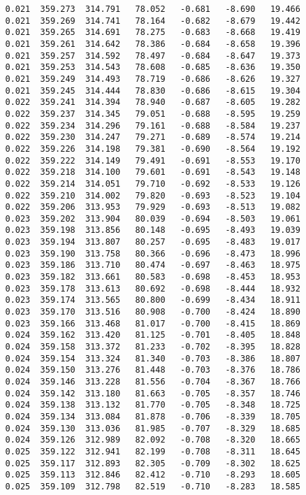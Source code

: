 \begin{verbatim}
   0.021  359.273  314.791   78.052   -0.681   -8.690   19.466
   0.021  359.269  314.741   78.164   -0.682   -8.679   19.442
   0.021  359.265  314.691   78.275   -0.683   -8.668   19.419
   0.021  359.261  314.642   78.386   -0.684   -8.658   19.396
   0.021  359.257  314.592   78.497   -0.684   -8.647   19.373
   0.021  359.253  314.543   78.608   -0.685   -8.636   19.350
   0.021  359.249  314.493   78.719   -0.686   -8.626   19.327
   0.021  359.245  314.444   78.830   -0.686   -8.615   19.304
   0.022  359.241  314.394   78.940   -0.687   -8.605   19.282
   0.022  359.237  314.345   79.051   -0.688   -8.595   19.259
   0.022  359.234  314.296   79.161   -0.688   -8.584   19.237
   0.022  359.230  314.247   79.271   -0.689   -8.574   19.214
   0.022  359.226  314.198   79.381   -0.690   -8.564   19.192
   0.022  359.222  314.149   79.491   -0.691   -8.553   19.170
   0.022  359.218  314.100   79.601   -0.691   -8.543   19.148
   0.022  359.214  314.051   79.710   -0.692   -8.533   19.126
   0.022  359.210  314.002   79.820   -0.693   -8.523   19.104
   0.022  359.206  313.953   79.929   -0.693   -8.513   19.082
   0.023  359.202  313.904   80.039   -0.694   -8.503   19.061
   0.023  359.198  313.856   80.148   -0.695   -8.493   19.039
   0.023  359.194  313.807   80.257   -0.695   -8.483   19.017
   0.023  359.190  313.758   80.366   -0.696   -8.473   18.996
   0.023  359.186  313.710   80.474   -0.697   -8.463   18.975
   0.023  359.182  313.661   80.583   -0.698   -8.453   18.953
   0.023  359.178  313.613   80.692   -0.698   -8.444   18.932
   0.023  359.174  313.565   80.800   -0.699   -8.434   18.911
   0.023  359.170  313.516   80.908   -0.700   -8.424   18.890
   0.023  359.166  313.468   81.017   -0.700   -8.415   18.869
   0.024  359.162  313.420   81.125   -0.701   -8.405   18.848
   0.024  359.158  313.372   81.233   -0.702   -8.395   18.828
   0.024  359.154  313.324   81.340   -0.703   -8.386   18.807
   0.024  359.150  313.276   81.448   -0.703   -8.376   18.786
   0.024  359.146  313.228   81.556   -0.704   -8.367   18.766
   0.024  359.142  313.180   81.663   -0.705   -8.357   18.746
   0.024  359.138  313.132   81.770   -0.705   -8.348   18.725
   0.024  359.134  313.084   81.878   -0.706   -8.339   18.705
   0.024  359.130  313.036   81.985   -0.707   -8.329   18.685
   0.024  359.126  312.989   82.092   -0.708   -8.320   18.665
   0.025  359.122  312.941   82.199   -0.708   -8.311   18.645
   0.025  359.117  312.893   82.305   -0.709   -8.302   18.625
   0.025  359.113  312.846   82.412   -0.710   -8.293   18.605
   0.025  359.109  312.798   82.519   -0.710   -8.283   18.585

\end{verbatim}
